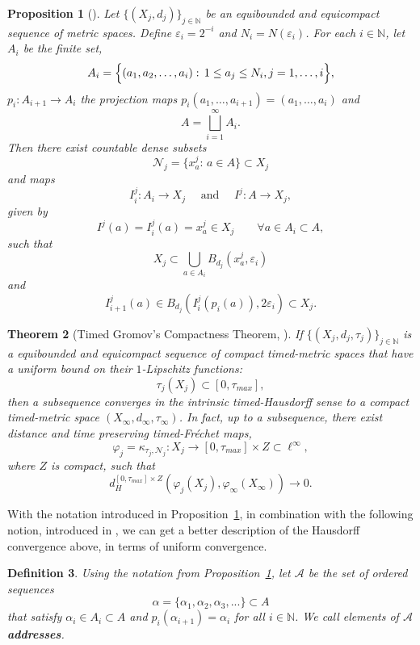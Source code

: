 \documentclass[a4paper,12pt,reqno]{amsart}
\theoremstyle{plain}
\newtheorem{thm}{Theorem}[section]
\newtheorem{prop}[thm]{Proposition}
\newtheorem{defn}[thm]{Definition}
\newcommand{\be}{\begin{equation}}
\newcommand{\ee}{\end{equation}}
\begin{document}
\begin{prop}[\cite{Che-Perales-Sormani-2025}]\label{prop:selection}
Let $\{(X_j,d_j)\}_{j\in\mathbb{N}}$ be an equibounded and equicompact sequence of metric spaces. Define $\varepsilon_i = 2^{-i}$ and $N_i=N(\varepsilon_i)$. 
\bigskip
For each $i\in {\mathbb N}$, let $A_i$ be the finite set, 
\be \label{eq:index}
A_i= \Bigl\{(a_1, a_2, \ldots, a_i): \, 1 \leq a_j \leq N_i, j=1,\ldots, i \Bigr\},
\ee
$p_i: A_{i+1} \to A_i$ the projection maps
$p_i(a_1,\ldots,a_{i+1})=(a_1,\ldots,a_{i})$
and
\be\label{eq:A-cntble}
A=\bigsqcup_{i=1}^{\infty }A_i.
\ee
Then there exist countable dense subsets 
\be
{\mathcal{N}}_j = \{x_a^j:\, a\in A\} \subset X_j
\ee
and maps
\be\label{eq:Iji}
I^j_i \colon  A_i \to X_j \quad\textrm{ and }\quad I^j\colon  A\to X_j,
\ee
given by
\be
I^j(a)=I^j_i(a)=x_a^j \in X_j \qquad \forall a \in A_i \subset A, 
\ee
such that 
\be \label{eq:cover}
X_j \subset \bigcup_{a\in A_i} B_{d_j}(x^j_a,\varepsilon_i)
\ee
and 
\be \label{eq:in-0}
I^j_{i+1}(a) \in B_{d_j}(I^j_i(p_i(a)), 2\varepsilon_i)\subset X_j.
\ee
\end{prop}


\begin{thm}
[Timed Gromov's Compactness Theorem, \cite{Che-Perales-Sormani-2025}]\label{thm:timed-Gromov-compactness-CPS}
If $\{(X_j,d_j,\tau_j)\}_{j\in\mathbb{N}}$ is a equibounded and equicompact sequence of compact timed-metric spaces that have a uniform bound on their $1$-Lipschitz functions:
\[
\tau_j(X_j)\subset [0,\tau_{max}],
\]
then a subsequence converges in the intrinsic timed-Hausdorff sense to a compact timed-metric space $(X_\infty, d_\infty, \tau_\infty)$. In fact, 
up to a subsequence, 
there exist distance and time preserving 
timed-Fr\'echet maps,
\[
\varphi_j= \kappa_{\tau_j,\mathcal N_j}\colon  X_j \to [0,\tau_{max}]\times Z \subset \ell^\infty,
\]
where $Z$ is compact, such that 
\be \label{eq:H-A}
d_H^{[0,\tau_{max}]\times Z}(\varphi_j(X_j),\varphi_\infty(X_\infty))\to 0.
\ee
\end{thm}

\bigskip


With the notation introduced in Proposition~\ref{prop:selection}, 
in combination with the following notion, introduced in \cite[Definition~3.3]{Che-Perales-Sormani-2025}, we can get a better description of the Hausdorff convergence above, in terms of uniform convergence. 

\begin{defn}\label{defn:addresses}
Using the notation from Proposition~\ref{prop:selection}, let $\mathcal{A}$ be the set of ordered sequences
\[
\alpha=\{\alpha_1,\alpha_2,\alpha_3,...\} \subset A
\]
that satisfy $\alpha_i \in A_i\subset A$ and 
$p_i(\alpha_{i+1})=\alpha_i$ for all $i \in {\mathbb N}$. We call elements of $\mathcal{A}$ {\bf addresses}.
\end{defn}
\end{document}

